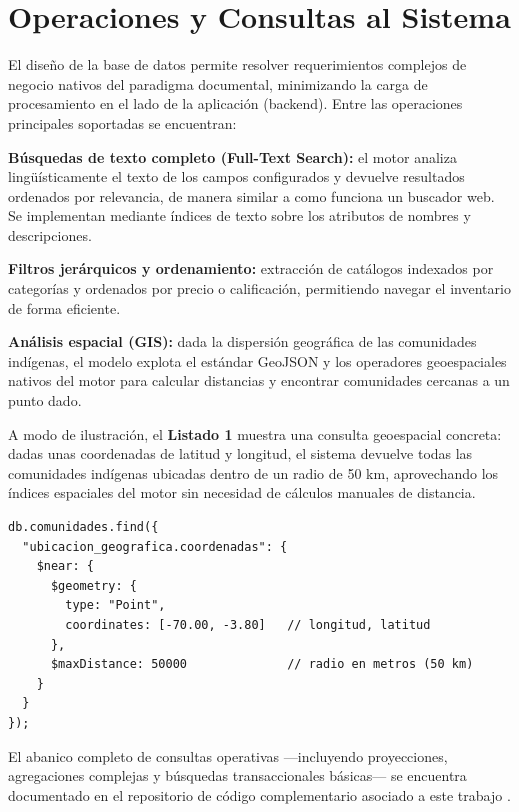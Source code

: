 \documentclass[conference]{IEEEtran}
\begin{document}
\section{Operaciones y Consultas al Sistema}
El diseño de la base de datos permite resolver requerimientos complejos de negocio nativos del paradigma documental, minimizando la carga de procesamiento en el lado de la aplicación (backend). Entre las operaciones principales soportadas se encuentran:
\begin{itemize}
\begin{sloppypar}
    \item \textbf{Búsquedas de texto completo (Full-Text Search):} el motor analiza lingüísticamente el texto de los campos configurados y devuelve resultados ordenados por relevancia, de manera similar a como funciona un buscador web. Se implementan mediante índices de texto sobre los atributos de nombres y descripciones.
\end{sloppypar}
    \item \textbf{Filtros jerárquicos y ordenamiento:} extracción de catálogos indexados por categorías y ordenados por precio o calificación, permitiendo navegar el inventario de forma eficiente.
    \item \textbf{Análisis espacial (GIS):} dada la dispersión geográfica de las comunidades indígenas, el modelo explota el estándar GeoJSON y los operadores geoespaciales nativos del motor para calcular distancias y encontrar comunidades cercanas a un punto dado.
\end{itemize}

A modo de ilustración, el \textbf{Listado 1} muestra una consulta geoespacial concreta: dadas unas coordenadas de latitud y longitud, el sistema devuelve todas las comunidades indígenas ubicadas dentro de un radio de 50 km, aprovechando los índices espaciales del motor sin necesidad de cálculos manuales de distancia.

\begin{lstlisting}[caption={Consulta geoespacial para localización de comunidades en un radio de 50 km.}, label={lst:geo}, breaklines=true, basicstyle=\footnotesize\ttfamily]
db.comunidades.find({
  "ubicacion_geografica.coordenadas": {
    $near: {
      $geometry: {
        type: "Point",
        coordinates: [-70.00, -3.80]   // longitud, latitud
      },
      $maxDistance: 50000              // radio en metros (50 km)
    }
  }
});
\end{lstlisting}

El abanico completo de consultas operativas —incluyendo proyecciones, agregaciones complejas y búsquedas transaccionales básicas— se encuentra documentado en el repositorio de código complementario asociado a este trabajo \cite{marquez2026}.
\end{document}
